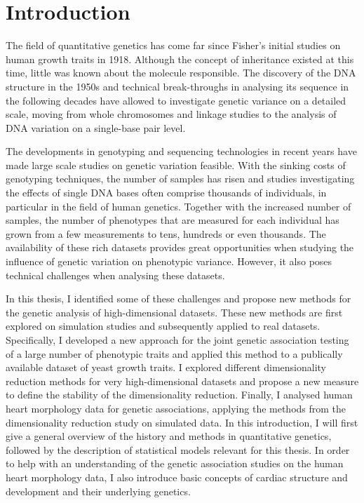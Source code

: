 \chapter{Introduction}
The field of quantitative genetics has come far since Fisher's initial studies on human growth traits in 1918. Although the concept of inheritance existed at this time, little was known about the molecule responsible. The discovery of the DNA structure in the 1950s and technical break-throughs in analysing its sequence in the following decades have allowed to investigate genetic variance on a detailed scale, moving from whole chromosomes and linkage studies to the analysis of DNA variation on a single-base pair level. 

The developments in genotyping and sequencing technologies in recent years have made large scale studies on genetic variation feasible. With the sinking costs of genotyping techniques, the number of samples has risen and studies investigating the effects of single DNA bases often comprise thousands of individuals, in particular in the field of human genetics.  Together with the increased number of samples, the number of phenotypes that are measured for each individual has grown from a few measurements to tens, hundreds or even thousands. The availability of these rich datasets provides great opportunities when studying the influence of genetic variation on phenotypic variance. However, it also poses technical challenges when analysing these datasets. 

In this thesis, I identified some of these challenges and propose new methods for the genetic analysis of high-dimensional datasets. These new methods are first explored on simulation studies and subsequently applied to real datasets. Specifically, I developed a new approach for the joint genetic association testing of a large number of phenotypic traits and applied this method to a publically available dataset of yeast growth traits. I explored different dimensionality reduction methods for very high-dimensional datasets and propose a new measure to define the stability of the dimensionality reduction. Finally, I analysed human heart morphology data for genetic associations, applying the methods from the dimensionality reduction study on simulated data. In this introduction, I will first give a general overview of the history and methods in quantitative genetics, followed by the description of statistical models relevant for this thesis. In order to help with an understanding of the genetic association studies on the human heart morphology data, I also introduce basic concepts of cardiac structure and development and their underlying genetics. 

